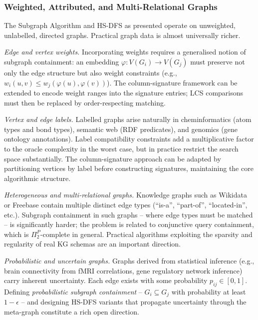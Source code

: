 ﻿\documentclass[12pt,a4paper]{article}
\theoremstyle{plain}
\theoremstyle{definition}
\theoremstyle{remark}
\begin{document}
	\subsubsection*{Weighted, Attributed, and Multi-Relational Graphs}

	The Subgraph Algorithm and HS-DFS as presented operate on unweighted,
	unlabelled, directed graphs.  Practical graph data is almost universally
	richer.

	\emph{Edge and vertex weights.}  Incorporating weights requires a
	generalised notion of subgraph containment: an embedding
	$\varphi: V(G_i) \to V(G_j)$ must preserve not only the edge structure
	but also weight constraints (e.g., $w_i(u,v) \leq w_j(\varphi(u),\varphi(v))$).
	The column-signature framework can be extended to encode weight ranges into
	the signature entries; LCS comparisons must then be replaced by
	order-respecting matching.

	\emph{Vertex and edge labels.}  Labelled graphs arise naturally in
	cheminformatics (atom types and bond types), semantic web (RDF predicates),
	and genomics (gene ontology annotations).  Label compatibility constraints
	add a multiplicative factor to the oracle complexity in the worst case,
	but in practice restrict the search space substantially.  The
	column-signature approach can be adapted by partitioning vertices by label
	before constructing signatures, maintaining the core algorithmic structure.

	\emph{Heterogeneous and multi-relational graphs.}  Knowledge graphs such
	as Wikidata or Freebase contain multiple distinct edge types
	(``is-a'', ``part-of'', ``located-in'', etc.).  Subgraph containment in
	such graphs -- where edge types must be matched -- is significantly harder;
	the problem is related to conjunctive query containment, which is
	$\Pi_2^P$-complete in general.  Practical algorithms exploiting the
	sparsity and regularity of real KG schemas are an important direction.

	\emph{Probabilistic and uncertain graphs.}  Graphs derived from statistical
	inference (e.g., brain connectivity from fMRI correlations, gene regulatory
	network inference) carry inherent uncertainty.  Each edge exists with some
	probability $p_{ij} \in [0,1]$.  Defining \emph{probabilistic subgraph
	containment} -- $G_i \subseteq G_j$ with probability at least $1-\epsilon$ --
	and designing HS-DFS variants that propagate uncertainty through the
	meta-graph constitute a rich open direction.
\end{document}
